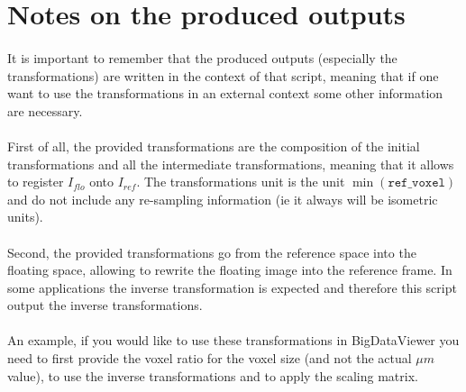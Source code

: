 \documentclass[10pt,a4paper]{book}
\begin{document}
\section{Notes on the produced outputs}
\paragraph{}It is important to remember that the produced outputs (especially the transformations) are written in the context of that script, meaning that if one want to use the transformations in an external context some other information are necessary.
\paragraph{}First of all, the provided transformations are the composition of the initial transformations and all the intermediate transformations, meaning that it allows to register $I_{flo}$ onto $I_{ref}$. The transformations unit is the unit $\min(\texttt{ref\_voxel})$ and do not include any re-sampling information (ie it always will be isometric units).
\paragraph{}Second, the provided transformations go from the reference space into the floating space, allowing to rewrite the floating image into the reference frame. In some applications the inverse transformation is expected and therefore this script output the inverse transformations.
\paragraph{}An example, if you would like to use these transformations in BigDataViewer you need to first provide the voxel ratio for the voxel size (and not the actual $\mu m$ value), to use the inverse transformations and to apply the scaling matrix.


\end{document}
